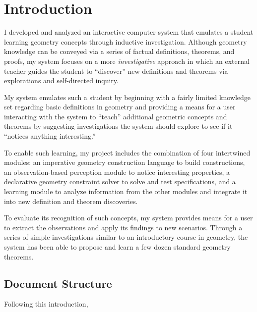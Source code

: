 \chapter{Introduction}
\label{chap:intro}

I developed and analyzed an interactive computer system that emulates
a student learning geometry concepts through inductive
investigation. Although geometry knowledge can be conveyed via a
series of factual definitions, theorems, and proofs, my system focuses
on a more \emph{investigative} approach in which an external teacher
guides the student to ``discover'' new definitions and theorems via
explorations and self-directed inquiry.

My system emulates such a student by beginning with a fairly limited
knowledge set regarding basic definitions in geometry and providing a
means for a user interacting with the system to ``teach'' additional
geometric concepts and theorems by suggesting investigations the
system should explore to see if it ``notices anything interesting.''

To enable such learning, my project includes the combination of four
intertwined modules: an imperative geometry construction language to
build constructions, an observation-based perception module to notice
interesting properties, a declarative geometry constraint solver to
solve and test specifications, and a learning module to analyze
information from the other modules and integrate it into new
definition and theorem discoveries.

To evaluate its recognition of such concepts, my system provides means
for a user to extract the observations and apply its findings to new
scenarios.  Through a series of simple investigations similar to an
introductory course in geometry, the system has been able to propose
and learn a few dozen standard geometry theorems.

\section{Document Structure}

Following this introduction,

